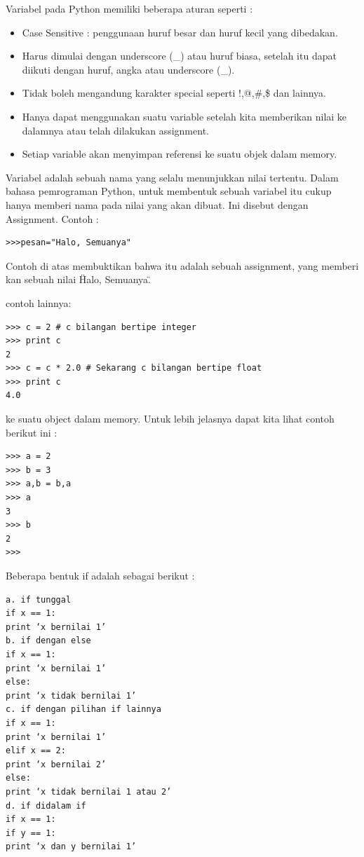 Variabel pada Python memiliki beberapa aturan seperti :
\begin{itemize}
\item
Case Sensitive : penggunaan huruf besar dan huruf kecil yang dibedakan.
\item
Harus dimulai dengan underscore (\_) atau huruf biasa, setelah itu dapat diikuti dengan huruf, angka atau underscore (\_).
\item
Tidak boleh mengandung karakter special seperti !,@,\#,\$ dan lainnya.
\item
Hanya dapat menggunakan suatu variable setelah kita memberikan nilai ke dalamnya atau telah dilakukan assignment.
\item
Setiap variable akan menyimpan referensi ke suatu objek dalam memory.\cite{santoso2009bahasa}
\end{itemize}

Variabel adalah sebuah nama yang selalu menunjukkan nilai tertentu. Dalam bahasa pemrograman Python, untuk membentuk sebuah variabel itu cukup hanya memberi nama pada nilai yang akan dibuat. Ini disebut dengan Assignment.
Contoh : 
\begin{verbatim}
>>>pesan="Halo, Semuanya"
\end{verbatim}
Contoh di atas membuktikan bahwa itu adalah sebuah assignment, yang memberi kan sebuah nilai \"Halo, Semuanya\".\cite{utami2004logika}

contoh lainnya:
\begin{verbatim}
>>> c = 2 # c bilangan bertipe integer
>>> print c
2
>>> c = c * 2.0 # Sekarang c bilangan bertipe float
>>> print c
4.0
\end{verbatim}

ke suatu object dalam memory. Untuk lebih jelasnya
dapat kita lihat contoh berikut ini :
\begin{verbatim}
>>> a = 2
>>> b = 3
>>> a,b = b,a
>>> a
3
>>> b
2
>>>
\end{verbatim}

Beberapa bentuk if adalah sebagai berikut :
\begin{verbatim}
a. if tunggal
if x == 1:
print ‘x bernilai 1’
b. if dengan else
if x == 1:
print ‘x bernilai 1’
else:
print ‘x tidak bernilai 1’
c. if dengan pilihan if lainnya
if x == 1:
print ‘x bernilai 1’
elif x == 2:
print ‘x bernilai 2’
else:
print ‘x tidak bernilai 1 atau 2’
d. if didalam if
if x == 1:
if y == 1:
print ‘x dan y bernilai 1’
\end{verbatim}

